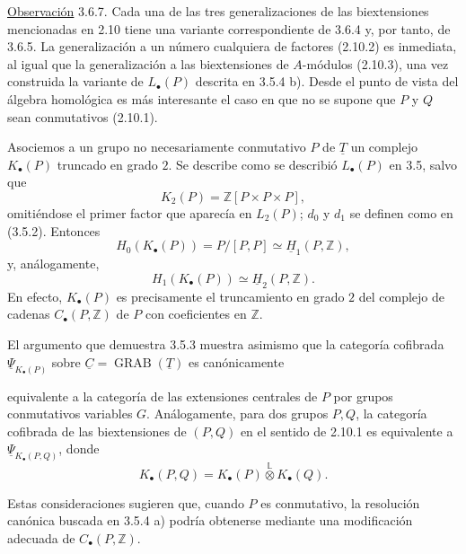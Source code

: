 \underline{Observación} 3.6.7. Cada una de las tres generalizaciones de
las biextensiones mencionadas en 2.10 tiene una variante correspondiente
de 3.6.4 y, por tanto, de 3.6.5. La generalización a un número cualquiera
de factores (2.10.2) es inmediata, al igual que la generalización a las
biextensiones de $A$-módulos (2.10.3), una vez construida la variante de
$L_\bullet(P)$ descrita en 3.5.4 b). Desde el punto de vista del álgebra
homológica es más interesante el caso en que no se supone que $P$ y $Q$
sean conmutativos (2.10.1).

Asociemos a un grupo no necesariamente conmutativo $P$ de $\underline T$
un complejo $K_\bullet(P)$ truncado en grado $2$. Se describe como se
describió $L_\bullet(P)$ en 3.5, salvo que
\[
 K_2(P)=\mathbb Z[P\times P\times P],
\]
omitiéndose el primer factor que aparecía en $L_2(P)$; $d_0$ y $d_1$ se
definen como en (3.5.2). Entonces
\[
 H_0(K_\bullet(P))=P/[P,P]
 \simeq\underline H_1(P,\mathbb Z),
\]
y, análogamente,
\[
 H_1(K_\bullet(P))\simeq\underline H_2(P,\mathbb Z).
\]
En efecto, $K_\bullet(P)$ es precisamente el truncamiento en grado $2$ del
complejo de cadenas $C_\bullet(P,\mathbb Z)$ de $P$ con coeficientes en
$\mathbb Z$.

El argumento que demuestra 3.5.3 muestra asimismo que la categoría
cofibrada $\underline\Psi_{K_\bullet(P)}$ sobre
$\underline C=\operatorname{GRAB}(\underline T)$ es canónicamente


equivalente a la categoría de las extensiones centrales de $P$ por grupos
conmutativos variables $G$. Análogamente, para dos grupos $P,Q$, la
categoría cofibrada de las biextensiones de $(P,Q)$ en el sentido de
2.10.1 es equivalente a $\underline\Psi_{K_\bullet(P,Q)}$, donde
\[
 K_\bullet(P,Q)
 =
 K_\bullet(P)\mathbin{\overset{\mathbb L}{\otimes}}K_\bullet(Q).
\]

Estas consideraciones sugieren que, cuando $P$ es conmutativo, la
resolución canónica buscada en 3.5.4 a) podría obtenerse mediante una
modificación adecuada de $C_\bullet(P,\mathbb Z)$.
